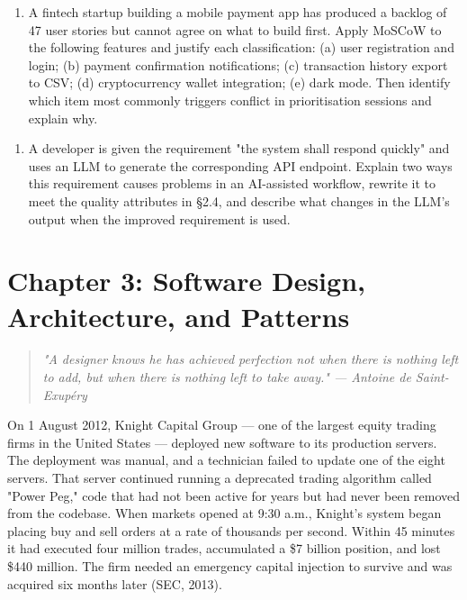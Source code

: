 \documentclass[11pt,a4paper]{book}
\begin{document}
\begin{enumerate}
  \item A fintech startup building a mobile payment app has produced a backlog of 47 user stories but cannot agree on what to build first. Apply MoSCoW to the following features and justify each classification: (a) user registration and login; (b) payment confirmation notifications; (c) transaction history export to CSV; (d) cryptocurrency wallet integration; (e) dark mode. Then identify which item most commonly triggers conflict in prioritisation sessions and explain why.
\end{enumerate}

\begin{enumerate}
  \item A developer is given the requirement "the system shall respond quickly" and uses an LLM to generate the corresponding API endpoint. Explain two ways this requirement causes problems in an AI-assisted workflow, rewrite it to meet the quality attributes in §2.4, and describe what changes in the LLM's output when the improved requirement is used.
\end{enumerate}


\chapter{Chapter 3: Software Design, Architecture, and Patterns}

\begin{quote}
\textit{\textit{"A designer knows he has achieved perfection not when there is nothing left to add, but when there is nothing left to take away."} --- Antoine de Saint-Exupéry}
\end{quote}

\medskip

On 1 August 2012, Knight Capital Group --- one of the largest equity trading firms in the United States --- deployed new software to its production servers. The deployment was manual, and a technician failed to update one of the eight servers. That server continued running a deprecated trading algorithm called "Power Peg," code that had not been active for years but had never been removed from the codebase. When markets opened at 9:30 a.m., Knight's system began placing buy and sell orders at a rate of thousands per second. Within 45 minutes it had executed four million trades, accumulated a \$7 billion position, and lost \$440 million. The firm needed an emergency capital injection to survive and was acquired six months later (SEC, 2013).
\end{document}
